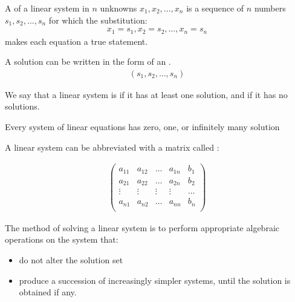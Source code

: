     \par A  of a linear system in $n$ unknowns
    $x_{1}, x_{2}, \ldots, x_{n}$ is a sequence of $n$ numbers
    $s_{1}, s_{2}, \ldots, s_{n}$ for which the substitution:
    \begin{align*}
      x_{1} = s_{1}, x_{2} = s_{2}, \ldots, x_{n} = s_{n}
    \end{align*}
    makes each equation a true statement.
    \par A solution can be written in the form of an .
    \begin{align*}
      (s_{1}, s_{2}, \ldots, s_{n})
    \end{align*}

    \par We say that a linear system is  if it has at least
      one solution, and  if it has no solutions.
    
    \par Every system of linear equations has zero, one, or infinitely many
      solution 


    \par A linear system can be abbreviated with a matrix called
    :

    \begin{align*}
      \begin{pmatrix}
        a_{11} & a_{12} & \ldots & a_{1n} & b_{1} \\
        a_{21} & a_{22} & \ldots & a_{2n} & b_{2} \\
        \vdots & \vdots & \vdots & \vdots & \ldots \\
        a_{n1} & a_{n2} & \ldots & a_{nn} & b_{n} \\
      \end{pmatrix}
    \end{align*}

    \par The method of solving a linear system is to perform appropriate
    algebraic operations on the system that:

    \begin{itemize}
      \item do not alter the solution set 
      \item produce a succession of increasingly simpler systems, until
        the solution is obtained if any.
    \end{itemize}

